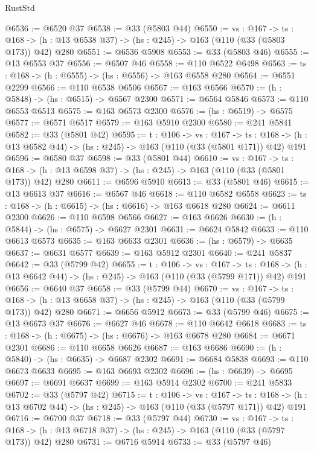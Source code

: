 \begin{lexlean}{RustStd}
\begin{coremodule}
@6536 := @6520 @37
@6538 := @33 (@5803 @44)
@6550 := {vs : @167} ->
  {ts : @168} -> (h : @13 @6538 @37) -> (hs : @245) -> @163 (@110 (@33 (@5803 @173)) @42) @280
@6551 := @6536 @5908
@6553 := @33 (@5803 @46)
@6555 := @13 @6553 @37
@6556 := @6507 @46
@6558 := @110 @6522 @6498
@6563 := {ts : @168} -> (h : @6555) -> (hs : @6556) -> @163 @6558 @280
@6564 := @6551 @2299
@6566 := @110 @6538 @6506
@6567 := @163 @6566
@6570 := (h : @5848) -> (hs : @6515) -> @6567 @2300
@6571 := @6564 @5846
@6573 := @110 @6553 @6513
@6575 := @163 @6573 @2300
@6576 := (hs : @6519) -> @6575
@6577 := @6571 @6517
@6579 := @163 @5910 @2300
@6580 := @241 @5841
@6582 := @33 (@5801 @42)
@6595 := {t : @106} ->
  {vs : @167} ->
  {ts : @168} -> (h : @13 @6582 @44) -> (hs : @245) -> @163 (@110 (@33 (@5801 @171)) @42) @191
@6596 := @6580 @37
@6598 := @33 (@5801 @44)
@6610 := {vs : @167} ->
  {ts : @168} -> (h : @13 @6598 @37) -> (hs : @245) -> @163 (@110 (@33 (@5801 @173)) @42) @280
@6611 := @6596 @5910
@6613 := @33 (@5801 @46)
@6615 := @13 @6613 @37
@6616 := @6567 @46
@6618 := @110 @6582 @6558
@6623 := {ts : @168} -> (h : @6615) -> (hs : @6616) -> @163 @6618 @280
@6624 := @6611 @2300
@6626 := @110 @6598 @6566
@6627 := @163 @6626
@6630 := (h : @5844) -> (hs : @6575) -> @6627 @2301
@6631 := @6624 @5842
@6633 := @110 @6613 @6573
@6635 := @163 @6633 @2301
@6636 := (hs : @6579) -> @6635
@6637 := @6631 @6577
@6639 := @163 @5912 @2301
@6640 := @241 @5837
@6642 := @33 (@5799 @42)
@6655 := {t : @106} ->
  {vs : @167} ->
  {ts : @168} -> (h : @13 @6642 @44) -> (hs : @245) -> @163 (@110 (@33 (@5799 @171)) @42) @191
@6656 := @6640 @37
@6658 := @33 (@5799 @44)
@6670 := {vs : @167} ->
  {ts : @168} -> (h : @13 @6658 @37) -> (hs : @245) -> @163 (@110 (@33 (@5799 @173)) @42) @280
@6671 := @6656 @5912
@6673 := @33 (@5799 @46)
@6675 := @13 @6673 @37
@6676 := @6627 @46
@6678 := @110 @6642 @6618
@6683 := {ts : @168} -> (h : @6675) -> (hs : @6676) -> @163 @6678 @280
@6684 := @6671 @2301
@6686 := @110 @6658 @6626
@6687 := @163 @6686
@6690 := (h : @5840) -> (hs : @6635) -> @6687 @2302
@6691 := @6684 @5838
@6693 := @110 @6673 @6633
@6695 := @163 @6693 @2302
@6696 := (hs : @6639) -> @6695
@6697 := @6691 @6637
@6699 := @163 @5914 @2302
@6700 := @241 @5833
@6702 := @33 (@5797 @42)
@6715 := {t : @106} ->
  {vs : @167} ->
  {ts : @168} -> (h : @13 @6702 @44) -> (hs : @245) -> @163 (@110 (@33 (@5797 @171)) @42) @191
@6716 := @6700 @37
@6718 := @33 (@5797 @44)
@6730 := {vs : @167} ->
  {ts : @168} -> (h : @13 @6718 @37) -> (hs : @245) -> @163 (@110 (@33 (@5797 @173)) @42) @280
@6731 := @6716 @5914
@6733 := @33 (@5797 @46)

\end{coremodule}
\end{lexlean}
